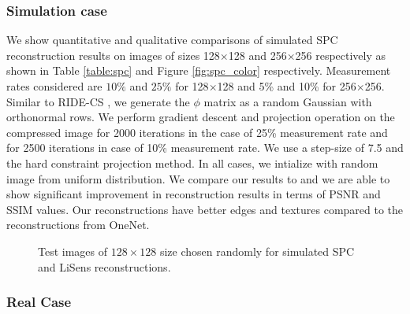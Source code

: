 \documentclass[journal,twoside]{IEEEtran}
\begin{document}
\subsubsection{Simulation case}
We show quantitative and qualitative comparisons of simulated SPC reconstruction results on images of sizes 128$\times$128 and 256$\times$256 respectively as shown in Table \ref{table:spc} and Figure \ref{fig:spc_color} respectively. Measurement rates considered are $10\%$ and $25\%$ for 128$\times$128 and 5\% and 10\% for 256$\times$256. Similar to RIDE-CS \cite{dave2017compressive}, we generate the $\phi$ matrix as a random Gaussian with orthonormal rows. We perform gradient descent and projection operation on the compressed image for 2000 iterations in the case of 25\% measurement rate and for 2500 iterations in case of 10\% measurement rate. We use a step-size of 7.5 and the hard constraint projection method. In all cases, we intialize with random image from uniform distribution.  We compare our results to \cite{chang2017one} and we are able to show significant improvement in reconstruction results in terms of PSNR and SSIM values. Our reconstructions have better edges and textures compared to the reconstructions from OneNet.

\begin{figure}[t]
    \centering
    \hspace{0.02 in}
    \hspace{0.02 in}
    \hspace{0.02 in}
    \hspace{0.02 in}
    \caption{Test images of $128 \times 128$ size chosen randomly for simulated SPC and LiSens reconstructions.}
    \label{fig:sel_imgs}
\end{figure}
\subsubsection{Real Case}
\end{document}
